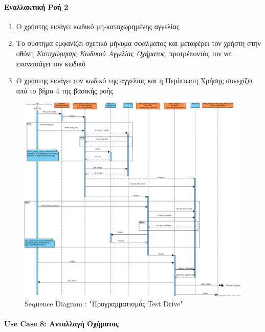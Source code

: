 \documentclass{../ol-softwaremanual}
\begin{document}
	
	\paragraph{Εναλλακτική Ροή 2}
	
	\begin{enumerate}
		\item Ο χρήστης εισάγει κωδικό μη-καταχωρημένης αγγελίας
		\item Το σύστημα εμφανίζει σχετικό μήνυμα σφάλματος και μεταφέρει τον χρήστη στην οθόνη \textit{Καταχώρησης Κωδικού Αγγελίας Οχήματος}, προτρέποντάς τον να επανεισάγει τον κωδικό
		\item Ο χρήστης εισάγει τον κωδικό της αγγελίας και η Περίπτωση Χρήσης συνεχίζει από το βήμα 4 της βασικής ροής
	\end{enumerate}
	
	\begin{figure}[htbp!]
		\centering
		\includegraphics[scale=0.315]{img/seq_test_drive.png}
		\caption{\en Sequence Diagram : "\gr Προγραμματισμός \en Test Drive"\gr}
	\end{figure}
	
	\newpage
	\centering
	
	\paragraph{\en Use Case 8: \gr  Ανταλλαγή Οχήματος \gr}
	
\end{document}
